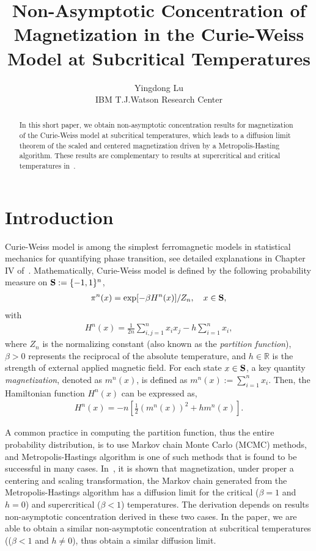 \documentclass{amsart}
\title[Non-Asymptotic Concentration of Magnetization in the Curie-Weiss Model ]{Non-Asymptotic Concentration of Magnetization in the Curie-Weiss Model at Subcritical Temperatures}%
\author{Yingdong Lu\\ IBM T.J.Watson Research Center}
\newcommand{\bS}{{\bf S}}               %
\newcommand{\Real}{\mathbb R}
\begin{document}
\maketitle
\begin{abstract}
In this short paper, we obtain non-asymptotic concentration results for magnetization of the Curie-Weiss model at subcritical temperatures, 
which leads to a diffusion limit theorem of the scaled and centered magnetization driven by a Metropolis-Hasting algorithm. 
These results are complementary to results at supercritical and critical temperatures in~\cite{bierkens2017}. 
\end{abstract}


\section{Introduction}
\label{sec:intro}

Curie-Weiss model is among the simplest ferromagnetic models in statistical mechanics for quantifying phase transition, see detailed explanations in Chapter IV of~\cite{ellis2006entropy}. 
Mathematically,  Curie-Weiss model is defined by the following probability measure on $\bS:=\{-1,1\}^n$,
\begin{align}
	\label{eqn:CW_defn}
	\pi^n(x)=\exp[-\beta H^n(x)]/Z_n, \quad x\in \bS,
\end{align}
with
\begin{align*}
	H^n(x) = \frac{1}{2n} \sum_{i,j=1}^n x_i x_j -h\sum_{i=1}^n x_i,
\end{align*}
where $Z_n$ is the normalizing constant (also known as the \emph{partition function}), $\beta>0$ represents the reciprocal of the absolute temperature, 
and $h\in \Real$ is the strength of external applied magnetic field. For each state $x\in \bS$, a key quantity \emph{magnetization}, denoted as $m^n(x)$, is defined as $m^n(x) := \sum_{i=1}^nx_i$.  
Then, the Hamiltonian function $H^n(x)$ can be expressed as,
\begin{align*}
	H^n(x) = -n \left[\frac12(m^n(x))^2+ hm^n(x)\right].
\end{align*}

A common practice in computing the partition function, thus the entire probability distribution, is to use Markov chain Monte Carlo (MCMC) methods, and Metropolis-Hastings algorithm is one of such methods that is found to be successful in many cases. In~\cite{bierkens2017},  it is shown that magnetization, under proper a centering and scaling transformation, the Markov chain generated from the Metropolis-Hastings algorithm has a diffusion limit for the critical ($\beta=1$ and $h=0$) and supercritical ($\beta<1$) temperatures. The derivation depends on results non-asymptotic concentration derived in these two cases. In the paper, we are able to obtain a similar non-asymptotic concentration at subcritical temperatures (($\beta<1$ and $h\neq 0$), thus obtain a similar diffusion limit. 
\end{document}
